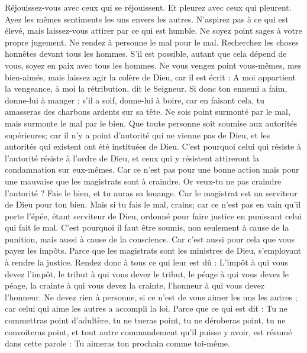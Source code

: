 \begin{multicols}{2}
Réjouissez-vous avec ceux qui se réjouissent. Et pleurez avec ceux qui pleurent.
Ayez les mêmes sentiments les uns envers les autres. N'aspirez pas à ce qui est élevé, mais laissez-vous attirer par ce qui est humble. Ne soyez point sages à votre propre jugement.
Ne rendez à personne le mal pour le mal. Recherchez les choses honnêtes devant tous les hommes.
S'il est possible, autant que cela dépend de vous, soyez en paix avec tous les hommes.
Ne vous vengez point vous-mêmes, mes bien-aimés, mais laissez agir la colère de Dieu, car il est écrit : A moi appartient la vengeance, à moi la rétribution, dit le Seigneur.
Si donc ton ennemi a faim, donne-lui à manger ; s'il a soif, donne-lui à boire, car en faisant cela, tu amasseras des charbons ardents sur sa tête.
Ne sois point surmonté par le mal, mais surmonte le mal par le bien.
\VerseOne{}Que toute personne soit soumise aux autorités supérieures; car il n'y a point d'autorité qui ne vienne pas de Dieu, et les autorités qui existent ont été instituées de Dieu.
C'est pourquoi celui qui résiste à l'autorité résiste à l'ordre de Dieu, et ceux qui y résistent attireront la condamnation sur eux-mêmes.
Car ce n'est pas pour une bonne action mais pour une mauvaise que les magistrats sont à craindre. Or veux-tu ne pas craindre l'autorité ? Fais le bien, et tu auras sa louange.
Car le magistrat est un serviteur de Dieu pour ton bien. Mais si tu fais le mal, crains; car ce n'est pas en vain qu'il porte l'épée, étant serviteur de Dieu, ordonné pour faire justice en punissant celui qui fait le mal.
C'est pourquoi il faut être soumis, non seulement à cause de la punition, mais aussi à cause de la conscience.
Car c'est aussi pour cela que vous payez les impôts. Parce que les magistrats sont les ministres de Dieu, s'employant à rendre la justice.
Rendez donc à tous ce qui leur est dû : L'impôt à qui vous devez l'impôt, le tribut à qui vous devez le tribut, le péage à qui vous devez le péage, la crainte à qui vous devez la crainte, l'honneur à qui vous devez l'honneur.
Ne devez rien à personne, si ce n'est de vous aimer les uns les autres ; car celui qui aime les autres a accompli la loi.
Parce que ce qui est dit : Tu ne commettras point d'adultère, tu ne tueras point, tu ne déroberas point, tu ne convoiteras point, et tout autre commandement qu'il puisse y avoir, est résumé dans cette parole : Tu aimeras ton prochain comme toi-même.

\end{multicols}

